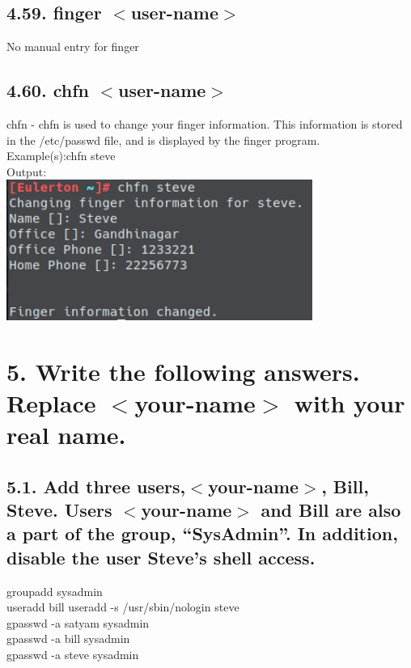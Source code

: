 \documentclass[11pt,a4]{article}
\begin{document}
\begin{enumerate}
\subsection*{4.59. finger $<$user-name$>$}
No manual entry for finger
\subsection*{4.60. chfn $<$user-name$>$}
  chfn -        chfn  is  used  to  change  your  finger  information.   This  information  is stored in the
  /etc/passwd file, and is displayed by the finger program. \\
  Example(s):chfn steve\\
  Output:\\
  \includegraphics[width=10cm]{Q4_60.png}
  

\end{enumerate}

\section*{5. Write the following answers. Replace $<$your-name$>$ with your real name.}
\subsection*{5.1. Add three users,$<$your-name$>$, Bill, Steve. Users $<$your-name$>$ and Bill are
	also a part of the group, “SysAdmin”. In addition, disable the user Steve’s shell
	access.}
groupadd sysadmin\\
useradd bill
useradd -s /usr/sbin/nologin steve\\
gpasswd -a satyam sysadmin\\
gpasswd -a bill sysadmin\\
gpasswd -a steve sysadmin

\end{document}
